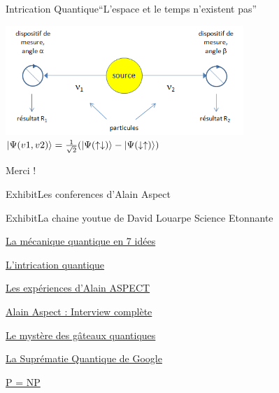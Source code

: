 \documentclass{beamer}
\begin{document}
\begin{frame}{Intrication Quantique}{``L'espace et le temps n'existent pas''}
  \begin{center}
        \includegraphics[width=9cm]{intrication.png}\\
    \vspace{0.5cm}
    $\ket{\Psi(v1, v2)} = \frac{1}{\sqrt{2}}(\ket{\Psi(\uparrow\downarrow)} - \ket{\Psi(\downarrow\uparrow)})$
  \end{center}
\end{frame}


\begin{frame}
        Merci !
\end{frame}

\begin{frame}{Exhibit}{Les conferences d'Alain Aspect}

\end{frame}

\begin{frame}{Exhibit}{La chaine youtue de David Louarpe Science Etonnante}
  \begin{description}
  \item \href{https://www.youtube.com/watch?v=Rj3jTw2DxXQ&t=3s}{La mécanique quantique en 7 idées}
  \item \href{https://www.youtube.com/watch?v=5R6k2mEacZo&t=8s}{L'intrication quantique}
  \item \href{https://www.youtube.com/watch?v=hB1kmGzpIrw}{Les expériences d'Alain ASPECT}
  \item \href{https://www.youtube.com/watch?v=OeZ_63iKPho&t=556s}{Alain Aspect : Interview complète}
  \item \href{https://www.youtube.com/watch?v=hB1kmGzpIrw}{Le mystère des gâteaux quantiques}
  \item \href{https://www.youtube.com/watch?v=KaRd_eB2qOA}{La Suprématie Quantique de Google}
  \item \href{https://www.youtube.com/watch?v=AgtOCNCejQ8}{P = NP}
  \end{description}
\end{frame}
\end{document}
